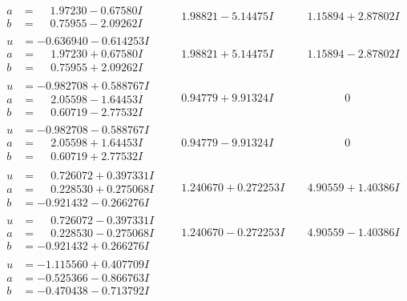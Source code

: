 \documentclass[1p]{elsarticle_modified}
\theoremstyle{definition}
\begin{document}
$$\begin{array}{c|c|c}
\begin{aligned}
a &= \phantom{-}1.97230 - 0.67580 I \\
b &= \phantom{-}0.75955 - 2.09262 I\end{aligned}
 & \phantom{-}1.98821 - 5.14475 I & \phantom{-}1.15894 + 2.87802 I \\ \hline\begin{aligned}
u &= -0.636940 - 0.614253 I \\
a &= \phantom{-}1.97230 + 0.67580 I \\
b &= \phantom{-}0.75955 + 2.09262 I\end{aligned}
 & \phantom{-}1.98821 + 5.14475 I & \phantom{-}1.15894 - 2.87802 I \\ \hline\begin{aligned}
u &= -0.982708 + 0.588767 I \\
a &= \phantom{-}2.05598 - 1.64453 I \\
b &= \phantom{-}0.60719 - 2.77532 I\end{aligned}
 & \phantom{-}0.94779 + 9.91324 I & \phantom{-0.000000 } 0 \\ \hline\begin{aligned}
u &= -0.982708 - 0.588767 I \\
a &= \phantom{-}2.05598 + 1.64453 I \\
b &= \phantom{-}0.60719 + 2.77532 I\end{aligned}
 & \phantom{-}0.94779 - 9.91324 I & \phantom{-0.000000 } 0 \\ \hline\begin{aligned}
u &= \phantom{-}0.726072 + 0.397331 I \\
a &= \phantom{-}0.228530 + 0.275068 I \\
b &= -0.921432 - 0.266276 I\end{aligned}
 & \phantom{-}1.240670 + 0.272253 I & \phantom{-}4.90559 + 1.40386 I \\ \hline\begin{aligned}
u &= \phantom{-}0.726072 - 0.397331 I \\
a &= \phantom{-}0.228530 - 0.275068 I \\
b &= -0.921432 + 0.266276 I\end{aligned}
 & \phantom{-}1.240670 - 0.272253 I & \phantom{-}4.90559 - 1.40386 I \\ \hline\begin{aligned}
u &= -1.115560 + 0.407709 I \\
a &= -0.525366 - 0.866763 I \\
b &= -0.470438 - 0.713792 I\end{aligned}

\end{array}$$
\end{document}
